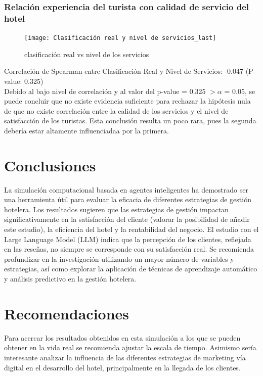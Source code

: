 \documentclass[12pt,a4paper]{article} \usepackage[spanish]{babel} \usepackage{graphicx} \usepackage{amsmath} \usepackage{amsfonts} \usepackage{amssymb} \usepackage{float} \usepackage{geometry}
\begin{document}
\subsubsection{Relación experiencia del turista con calidad de servicio del hotel} %
\begin{figure}[H] \centering \texttt{[image: Clasificación real y nivel de servicios\_last]} \caption{clasificación real vs nivel de los servicios} \label{fig:etiqueta} \end{figure}
Correlación de Spearman entre Clasificación Real y Nivel de Servicios: -0.047 (P-value: 0.325)\\
Debido al bajo nivel de correlación y al valor del p-value = 0.325 $> \alpha$ = 0.05, se puede concluir que no existe evidencia suficiente para rechazar la hipótesis nula de que no existe correlación entre la calidad de los servicios y el nivel de satisfacción de los turistas. Esta conclusión resulta un poco rara, pues la segunda debería estar altamente influenciadaa por la primera.


\section{Conclusiones}

La simulación computacional basada en agentes inteligentes ha demostrado ser una herramienta útil para evaluar la eficacia de diferentes estrategias de gestión hotelera. Los resultados sugieren que las estrategias de gestión impactan significativamente en la satisfacción del cliente (valorar la posibilidad de añadir este estudio), la eficiencia del hotel y la rentabilidad del negocio. El estudio con el Large Language Model (LLM) indica que la percepción de los clientes, reflejada en las reseñas, no siempre se corresponde con su satisfacción real. Se recomienda profundizar en la investigación utilizando un mayor número de variables y estrategias, así como explorar la aplicación de técnicas de aprendizaje automático y análisis predictivo en la gestión hotelera.

\section{Recomendaciones}

Para acercar los resultados obtenidos en esta simulación a los que se pueden obtener en la vida real se recomienda ajustar la escala de tiempo. Asimismo sería interesante analizar la influencia de las diferentes estrategias de marketing vía digital en el desarrollo del hotel, principalmente en la llegada de los clientes.
\end{document}
